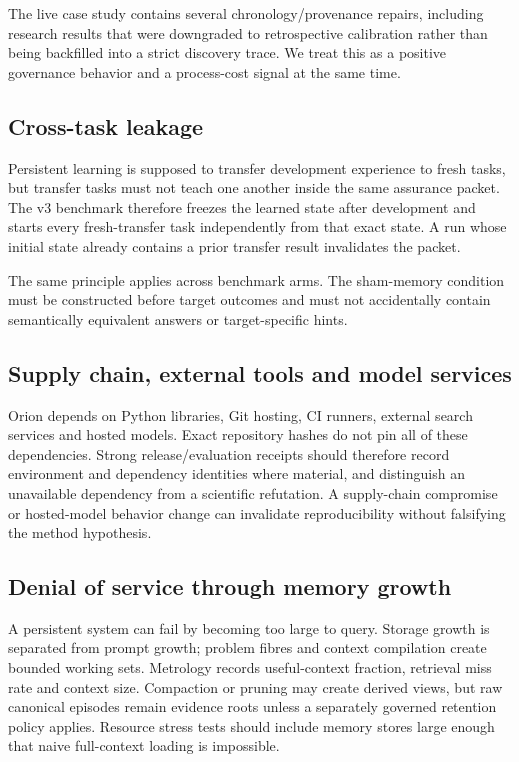 The live case study contains several chronology/provenance repairs, including research results that were downgraded to retrospective calibration rather than being backfilled into a strict discovery trace. We treat this as a positive governance behavior and a process-cost signal at the same time.

\subsection{Cross-task leakage}

Persistent learning is supposed to transfer development experience to fresh tasks, but transfer tasks must not teach one another inside the same assurance packet. The v3 benchmark therefore freezes the learned state after development and starts every fresh-transfer task independently from that exact state. A run whose initial state already contains a prior transfer result invalidates the packet.

The same principle applies across benchmark arms. The sham-memory condition must be constructed before target outcomes and must not accidentally contain semantically equivalent answers or target-specific hints.

\subsection{Supply chain, external tools and model services}

Orion depends on Python libraries, Git hosting, CI runners, external search services and hosted models. Exact repository hashes do not pin all of these dependencies. Strong release/evaluation receipts should therefore record environment and dependency identities where material, and distinguish an unavailable dependency from a scientific refutation. A supply-chain compromise or hosted-model behavior change can invalidate reproducibility without falsifying the method hypothesis.

\subsection{Denial of service through memory growth}

A persistent system can fail by becoming too large to query. Storage growth is separated from prompt growth; problem fibres and context compilation create bounded working sets. Metrology records useful-context fraction, retrieval miss rate and context size. Compaction or pruning may create derived views, but raw canonical episodes remain evidence roots unless a separately governed retention policy applies. Resource stress tests should include memory stores large enough that naive full-context loading is impossible.

